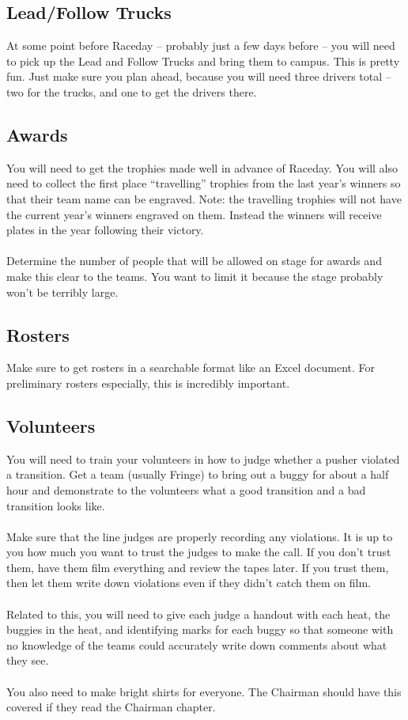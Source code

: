 \subsection{Lead/Follow Trucks}
At some point before Raceday -- probably just a few days before --
you will need to pick up the Lead and Follow Trucks and bring them to
campus. This is pretty fun. Just make sure you plan ahead, because you will
need three drivers total -- two for the trucks, and one to get the drivers
there.

\subsection{Awards}
You will need to get the trophies made well in advance of Raceday. You will
also need to collect the first place ``travelling'' trophies from the last
year's winners so that their team name can be engraved. Note: the travelling
trophies will not have the current year's winners engraved on them. Instead
the winners will receive plates in the year following their victory.
\\\\
Determine the number of people that will be allowed on stage for awards and
make this clear to the teams. You want to limit it because the stage
probably won't be terribly large.

\subsection{Rosters}
Make sure to get rosters in a searchable format like an Excel document.
For preliminary rosters especially, this is incredibly important.

\subsection{Volunteers}
You will need to train your volunteers in how to judge whether a pusher
violated a transition. Get a team (usually Fringe) to bring out a buggy for
about a half hour and demonstrate to the volunteers what a good transition
and a bad transition looks like.
\\\\
Make sure that the line judges are properly recording any violations. It is up
to you how much you want to trust the judges to make the call. If you don't
trust them, have them film everything and review the tapes later. If you
trust them, then let them write down violations even if they didn't catch
them on film.
\\\\
Related to this, you will need to give each judge a handout with each heat,
the buggies in the heat, and identifying marks for each buggy so that someone
with no knowledge of the teams could accurately write down comments about what
they see.
\\\\
You also need to make bright shirts for everyone. The Chairman should have
this covered if they read the Chairman chapter.

